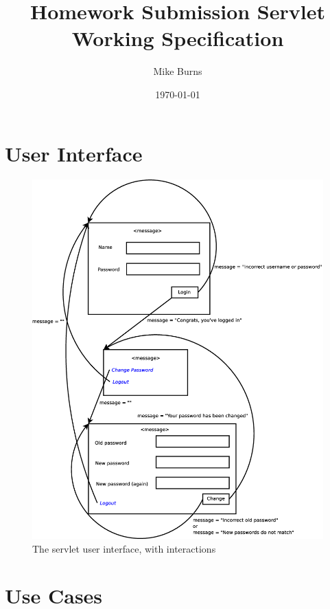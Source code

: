 \documentclass{article}
\begin{document}
\title{Homework Submission Servlet Working Specification}
\author{Mike Burns}
\date{\today}

\maketitle

\section{User Interface}\label{sec:ui}

\begin{figure}[ht]
\centering
\includegraphics[scale=.35]{servlet.eps}
\caption{The servlet user interface, with interactions}
\label{fig:ui}
\end{figure}

\section{Use Cases}\label{sec:usecases}
\end{document}
